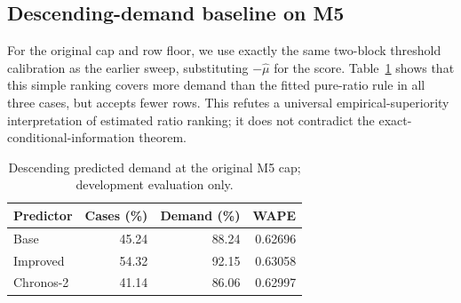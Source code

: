 \subsection{Descending-demand baseline on M5}
For the original cap and row floor, we use exactly the same two-block threshold calibration as the earlier sweep, substituting $-\hat\mu$ for the score. Table~\ref{tab:descending} shows that this simple ranking covers more demand than the fitted pure-ratio rule in all three cases, but accepts fewer rows. This refutes a universal empirical-superiority interpretation of estimated ratio ranking; it does not contradict the exact-conditional-information theorem.
\begin{table}[t]\centering\small
\caption{Descending predicted demand at the original M5 cap; development evaluation only.}\label{tab:descending}
\begin{tabular}{lrrr}\toprule Predictor & Cases (\%) & Demand (\%) & WAPE\\\midrule
Base & 45.24 & 88.24 & 0.62696\\
Improved & 54.32 & 92.15 & 0.63058\\
Chronos-2 & 41.14 & 86.06 & 0.62997\\
\bottomrule\end{tabular}\end{table}

